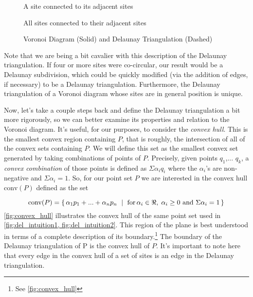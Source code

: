 \documentclass[12pt,twoside]{reedthesis}
\begin{document}
    \begin{figure}[!htb]
      \centering
      \begin{subtable}{.475\textwidth}
        
        \caption{A site connected to its adjacent sites}
        \label{fig:del_intuition1}
      \end{subtable}%
      \begin{subtable}{.475\textwidth}
        
        \caption{All sites connected to their adjacent sites}
        \label{fig:del_intuition2}
      \end{subtable}
      \caption{Voronoi Diagram (Solid) and Delaunay Triangulation (Dashed)}
      \label{fig:del_intuition}
    \end{figure}

    Note that we are being a bit cavalier with this description of the Delaunay triangulation. If four or more sites were co-circular, our result would be a Delaunay subdivision, which could be quickly modified (via the addition of edges, if necessary) to be a Delaunay triangulation. Furthermore, the Delaunay triangulation of a  Voronoi diagram whose sites are in general position is unique.\par

    Now, let's take a couple steps back and define the Delaunay triangulation a bit more rigorously, so we can better examine its properties and relation to the Voronoi diagram. It's useful, for our purposes, to consider the \emph{convex hull}.  This is the smallest convex region containing $P$, that is roughly, the intersection of all of the convex sets containing $P$. We will define this set as the smallest convex set generated by taking combinations of points of $P$. Precisely, given points $q_{1}$,... $q_{k}$, a \emph{convex combination} of those points is defined as $\Sigma\alpha_{i}q_{i}$ where the $\alpha_{i}$'s are non-negative and $\Sigma\alpha_{i}=1.$  So, for our point set $P$ we are interested in the convex hull  $\mbox{conv}(P)$ defined as the set


    \[
     \mbox{conv}(P) = \{\, \alpha_{1}p_{1} + ... + \alpha_{n}p_{n} \ \mid\ \text{for$ \,\alpha_{i} \in \Re, \; \alpha_{i} \geq 0$ and $\Sigma\alpha_{i} = 1$}\,\} 
    \]
    \cref{fig:convex_hull} illustrates the convex hull of the same point set used in \cref{fig:del_intuition1, fig:del_intuition2}. 
    This region of the plane is best understood in terms of a complete description of its boundary.\footnote{See \cref{fig:convex_hull}} 
    The boundary of the Delaunay triangulation of P is the convex hull of $P$. It's important to note here that every edge in the convex hull of a set of sites is an edge in the Delaunay triangulation.
\end{document}
